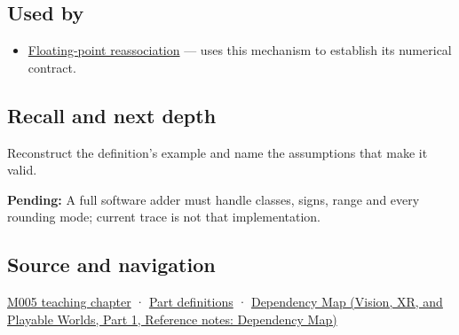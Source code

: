 \subsection{Used by}\label{appendix-a1b1b4580dfd-used-by}

\hypertarget{appendix-a1b1b4580dfd-used-by}{}

\begin{itemize}
\tightlist
\item
  \hyperref[appendix-c2ac4a84c283]{Floating-point reassociation} --- uses this mechanism to establish its numerical contract.
\end{itemize}

\subsection{Recall and next depth}\label{appendix-a1b1b4580dfd-recall-and-next-depth}

\hypertarget{appendix-a1b1b4580dfd-recall-and-next-depth}{}

Reconstruct the definition's example and name the assumptions that make it valid.

\textbf{Pending:} A full software adder must handle classes, signs, range and every rounding mode; current trace is not that implementation.

\subsection{Source and navigation}\label{appendix-a1b1b4580dfd-source-and-navigation}

\hypertarget{appendix-a1b1b4580dfd-source-and-navigation}{}

\hyperref[01-foundations-i-ch001-when-arithmetic-meets-uncertainty]{M005 teaching chapter} · \hyperref[appendix-fd090d982a15-m005---parts-77-88]{Part definitions} · \href{../07-Vision-XR-and-Playable-Worlds-P01/main.pdf\#nameddest=appendix-4ad47bdd269a}{Dependency Map (Vision, XR, and Playable Worlds, Part 1, Reference notes: Dependency Map)}

